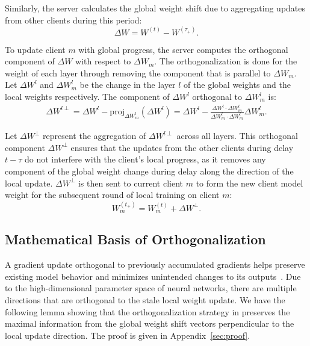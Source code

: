 Similarly, the server calculates the global weight shift due to aggregating updates from other clients during this period:
\begin{equation}
\Delta W = W^{(t)} - W^{(\tau_+)}.
\end{equation}

To update client $m$ with global progress, the server computes the orthogonal component of $\Delta W$ with respect to $\Delta W_m$. The orthogonalization is done for the weight of each layer through removing the component that is parallel to $\Delta W_m$. Let $\Delta W^{l}$ and $\Delta W^{l}_m$ be the change in the layer $l$ of the global weights and the local weights respectively. The component of $\Delta W^l$ orthogonal to $\Delta W_m^l$ is:
\begin{equation}
\label{eq:8}
\begin{aligned}
    \Delta W^{l\perp} = \Delta W^{l} - \text{proj}_{\Delta W_m^{l}}(\Delta W^{l})
    = \Delta W^{l} - \frac{\Delta W^{l} \cdot \Delta W_m^{l}}{\Delta W_m^{l} \cdot \Delta W_m^{l}} \Delta W_m^{l}.
\end{aligned} 
\end{equation}

Let $\Delta W^{\perp}$ represent the aggregation of $\Delta W^{l\perp}$ across all layers.
This orthogonal component $\Delta W^{\perp}$ ensures that the updates from the other clients during delay $t-\tau$ do not interfere with the client's local progress, as it removes any component of the global weight change during delay along the direction of the local update.
$\Delta W^{\perp}$ is then sent to current client $m$ to form the new client model weight for the subsequent round of local training on  client $m$:
\begin{equation}
    W_m^{(t_+)} = W_m^{(t)} + \Delta W^\perp.
\end{equation}

\subsection{Mathematical Basis of Orthogonalization}
\label{sec:math}
A gradient update orthogonal to previously accumulated gradients helps preserve existing model behavior and minimizes unintended changes to its outputs~\cite{farajtabar2020orthogonal}.
Due to the high-dimensional parameter space of neural networks, there are multiple directions that are orthogonal to the stale local weight update. We have the following lemma showing that the orthogonalization strategy in \our preserves the maximal information from the global weight shift vectors perpendicular to the local update direction. The proof is given in Appendix~\ref{sec:proof}.


